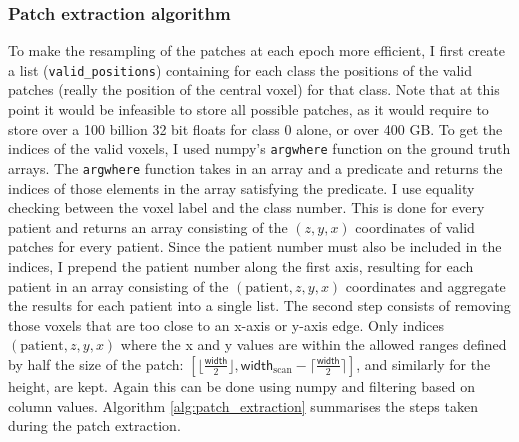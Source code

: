\documentclass[12pt,a4paper,twoside,openright]{report}
\begin{document}
\subsubsection{Patch extraction algorithm}
To make the resampling of the patches at each epoch more efficient, I first create a list (\texttt{valid\_positions}) containing for each class the positions of the valid patches (really the position of the central voxel) for that class. Note that at this point it would be infeasible to store all possible patches, as it would require to store over a 100 billion 32 bit floats for class 0 alone, or over 400 GB. To get the indices of the valid voxels, I used numpy's \texttt{argwhere} function on the ground truth arrays. The \texttt{argwhere} function takes in an array and a predicate and returns the indices of those elements in the array satisfying the predicate. I use equality checking between the voxel label and the class number. This is done for every patient and returns an array consisting of the $(z, y, x)$ coordinates of valid patches for every patient. Since the patient number must also be included in the indices, I prepend the patient number along the first axis, resulting for each patient in an array consisting of the $(\text{patient}, z, y, x)$ coordinates and aggregate the results for each patient into a single list. The second step consists of removing those voxels that are too close to an x-axis or y-axis edge. Only indices $(\text{patient}, z, y, x)$ where the x and y values are  within the allowed ranges defined by half the size of the patch: $[\lfloor \frac{\textsf{width}}{2} \rfloor, \textsf{width}_{\text{scan}} - \lceil \frac{\textsf{width}}{2} \rceil]$, and similarly for the height, are kept. Again this can be done using numpy and filtering based on column values. Algorithm \ref{alg:patch_extraction} summarises the steps taken during the patch extraction. 
\end{document}
